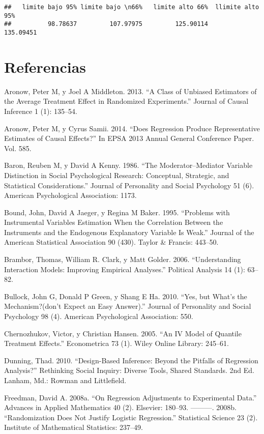 \documentclass[
]{article}
\begin{document}
\begin{verbatim}
##   limite bajo 95% limite bajo \n66%   limite alto 66%  llimite alto 95% 
##          98.78637         107.97975         125.90114         135.09451
\end{verbatim}

\hypertarget{referencias}{%
\section{Referencias}\label{referencias}}

Aronow, Peter M, y Joel A Middleton. 2013. ``A Class of Unbiased
Estimators of the Average Treatment Effect in Randomized Experiments.''
Journal of Causal Inference 1 (1): 135--54.

Aronow, Peter M, y Cyrus Samii. 2014. ``Does Regression Produce
Representative Estimates of Causal Effects?'' In EPSA 2013 Annual
General Conference Paper. Vol. 585.

Baron, Reuben M, y David A Kenny. 1986. ``The Moderator--Mediator
Variable Distinction in Social Psychological Research: Conceptual,
Strategic, and Statistical Considerations.'' Journal of Personality and
Social Psychology 51 (6). American Psychological Association: 1173.

Bound, John, David A Jaeger, y Regina M Baker. 1995. ``Problems with
Instrumental Variables Estimation When the Correlation Between the
Instruments and the Endogenous Explanatory Variable Is Weak.'' Journal
of the American Statistical Association 90 (430). Taylor \& Francis:
443--50.

Brambor, Thomas, William R. Clark, y Matt Golder. 2006. ``Understanding
Interaction Models: Improving Empirical Analyses.'' Political Analysis
14 (1): 63--82.

Bullock, John G, Donald P Green, y Shang E Ha. 2010. ``Yes, but What's
the Mechanism?(don't Expect an Easy Answer).'' Journal of Personality
and Social Psychology 98 (4). American Psychological Association: 550.

Chernozhukov, Victor, y Christian Hansen. 2005. ``An IV Model of
Quantile Treatment Effects.'' Econometrica 73 (1). Wiley Online Library:
245--61.

Dunning, Thad. 2010. ``Design-Based Inference: Beyond the Pitfalls of
Regression Analysis?'' Rethinking Social Inquiry: Diverse Tools, Shared
Standards. 2nd Ed. Lanham, Md.: Rowman and Littlefield.

Freedman, David A. 2008a. ``On Regression Adjustments to Experimental
Data.'' Advances in Applied Mathematics 40 (2). Elsevier: 180--93.
---------. 2008b. ``Randomization Does Not Justify Logistic
Regression.'' Statistical Science 23 (2). Institute of Mathematical
Statistics: 237--49.
\end{document}
